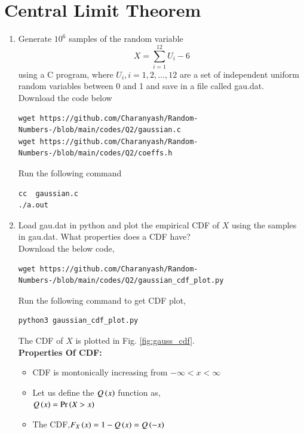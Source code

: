 \documentclass[journal,12pt,twocolumn]{IEEEtran}
\renewcommand\thesection{\arabic{section}}
\begin{document}
\section{Central Limit Theorem}
%
\begin{enumerate}[label=\thesection.\arabic*
,ref=\thesection.\theenumi]

%
\item
Generate $10^6$ samples of the random variable
%
\begin{equation}
X = \sum_{i=1}^{12}U_i -6
\end{equation}
%
using a C program, where $U_i, i = 1,2,\dots, 12$ are  a set of independent uniform random variables between 0 and 1
and save in a file called gau.dat.\\
\solution Download the code below
\begin{lstlisting}
wget https://github.com/Charanyash/Random-Numbers-/blob/main/codes/Q2/gaussian.c
wget https://github.com/Charanyash/Random-Numbers-/blob/main/codes/Q2/coeffs.h
\end{lstlisting}
Run the following command
\begin{lstlisting}
cc  gaussian.c
./a.out
\end{lstlisting}
%
\item
Load gau.dat in python and plot the empirical CDF of $X$ using the samples in gau.dat. What properties does a CDF have?\\
\solution Download the below code,
\begin{lstlisting}
wget https://github.com/Charanyash/Random-Numbers-/blob/main/codes/Q2/gaussian_cdf_plot.py
\end{lstlisting}
Run the following command to get CDF plot,
\begin{lstlisting}
python3 gaussian_cdf_plot.py
\end{lstlisting}
The CDF of $X$ is plotted in Fig. \ref{fig:gauss_cdf}.\\
\textbf{Properties Of CDF:}
 \begin{itemize}
      \item CDF is montonically increasing from $ -\infty < x< \infty$	 
      \item Let us define the $Q\left(x\right)$ function as,\\
	      $ Q\left(x\right) = \Pr\left(X>x\right) $
      \item The CDF,$F_{X}\left(x\right) = 1-Q\left(x\right) =Q\left(-x\right) $ 	      
 \end{itemize}


\end{enumerate}
\end{document}
